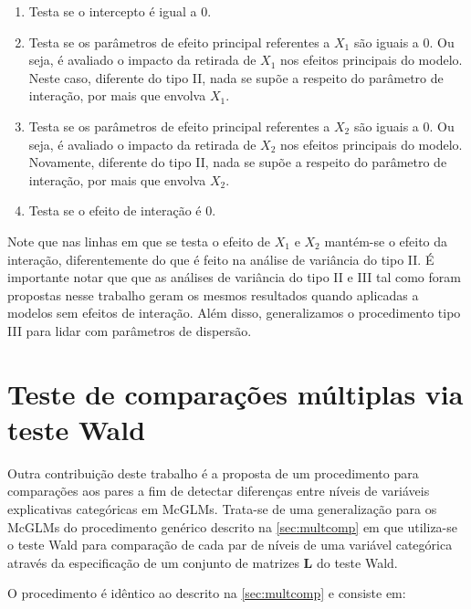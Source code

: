\begin{enumerate}
  \item Testa se o intercepto é igual a 0.
  
  \item Testa se os parâmetros de efeito principal referentes a $X_1$ são iguais a 0. Ou seja, é avaliado o impacto da retirada de $X_1$ nos efeitos principais do modelo. Neste caso, diferente do tipo II, nada se supõe a respeito do parâmetro de interação, por mais que envolva $X_1$.
  
  \item Testa se os parâmetros de efeito principal referentes a $X_2$ são iguais a 0. Ou seja, é avaliado o impacto da retirada de $X_2$ nos efeitos principais do modelo. Novamente, diferente do tipo II, nada se supõe a respeito do parâmetro de interação, por mais que envolva $X_2$.
  
  \item Testa se o efeito de interação é 0.
\end{enumerate}

Note que nas linhas em que se testa o efeito de $X_1$ e $X_2$ mantém-se o efeito da interação, diferentemente do que é feito na análise de variância do tipo II. É importante notar que que as análises de variância do tipo II e III tal como foram propostas nesse trabalho geram os mesmos resultados quando aplicadas a modelos sem efeitos de interação. Além disso, generalizamos o procedimento tipo III para lidar com parâmetros de dispersão.


\section{Teste de comparações múltiplas via teste Wald}

Outra contribuição deste trabalho é a proposta de um procedimento para comparações aos pares a fim de detectar diferenças entre níveis de variáveis explicativas categóricas em McGLMs. Trata-se de uma generalização para os McGLMs do procedimento genérico descrito na \autoref{sec:multcomp} em que utiliza-se o teste Wald para comparação de cada par de níveis de uma variável categórica através da especificação de um conjunto de matrizes $\boldsymbol{L}$ do teste Wald.

O procedimento é idêntico ao descrito na \autoref{sec:multcomp} e consiste em:  

